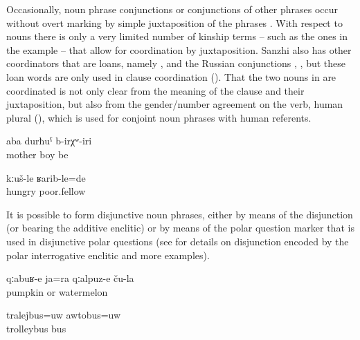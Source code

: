 Occasionally, noun phrase conjunctions or conjunctions of other phrases occur without overt marking by simple juxtaposition of the phrases . With respect to nouns there is only a very limited number of kinship terms – such as the ones in the example  – that allow for coordination by juxtaposition. Sanzhi also has other coordinators that are loans, namely  , and the Russian conjunctions  ,  , but these loan words are only used in clause coordination (). That the two nouns in  are coordinated is not only clear from the meaning of the clause and their juxtaposition, but also from the gender/number agreement on the verb, human plural (), which is used for conjoint noun phrases with human referents.
%
\begin{exe}
	\ex	\label{ex:There were mother and son}
	\gll	aba	durħuˁ	b-irχʷ-iri\\
		mother	boy	be\\
	\glt	{}

	\ex	\label{ex:‎They were hungry and poor}
	\gll	kːuš-le	ʁarib-le=de\\
		hungry	poor.fellow\\
	\glt	{}
\end{exe}

It is possible to form disjunctive noun phrases, either by means of the disjunction  (or  bearing the additive enclitic)  or by means of the polar question marker   that is used in disjunctive polar questions (see  for details on disjunction encoded by the polar interrogative enclitic and more examples).
%
\begin{exe}
	\ex	\label{ex:their pumpkins or watermelons}
	\gll	qːabuʁ-e	ja=ra	qːalpuz-e	ču-la\\
		pumpkin	or	watermelon	\\
	\glt	{}

	\ex	\label{ex:‎a trolleybus or a bus}
	\gll	tralejbus=uw		awtobus=uw	\\
		trolleybus	bus\\
	\glt	{}
\end{exe}

